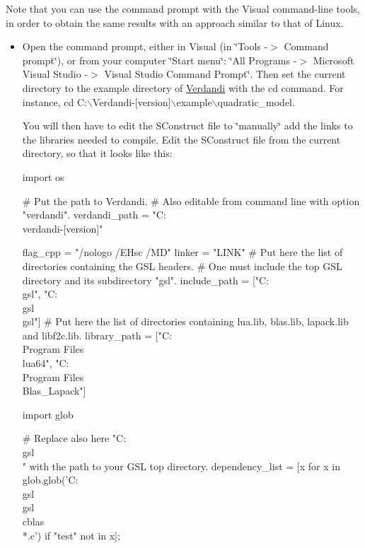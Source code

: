 \documentclass{tufte-book}
\begin{document}
\-Note that you can use the command prompt with the \-Visual command-\/line tools, in order to obtain the same results with an approach similar to that of \-Linux.
\begin{itemize}
\item \-Open the command prompt, either in \-Visual (in \char`\"{}\-Tools -\/$>$ Command prompt\char`\"{}), or from your computer \char`\"{}\-Start menu\char`\"{}\-: \char`\"{}\-All Programs -\/$>$ Microsoft Visual Studio -\/$>$ Visual Studio Command Prompt\char`\"{}. \-Then set the current directory to the example directory of \hyperlink{namespace_verdandi}{\-Verdandi} with the {\ttfamily cd} command. \-For instance, {\ttfamily cd \-C\-:$\backslash$\-Verdandi-\/\mbox{[}version\mbox{]}$\backslash$example$\backslash$quadratic\-\_\-model}.

\-You will then have to edit the {\ttfamily \-S\-Construct} file to \char`\"{}manually\char`\"{} add the links to the libraries needed to compile. \-Edit the {\ttfamily \-S\-Construct} file from the current directory, so that it looks like this\-:

\begin{frame_python}
import os

# Put the path to Verdandi.
# Also editable from command line with option "verdandi".
verdandi_path = "C:\\verdandi-[version]"

flag_cpp = "/nologo /EHsc /MD"
linker = "LINK"
# Put here the list of directories containing the GSL headers.
# One must include the top GSL directory and its subdirectory "gsl".
include_path = ["C:\\gsl", "C:\\gsl\\gsl"]
# Put here the list of directories containing lua.lib, blas.lib, lapack.lib and libf2c.lib.
library_path = ["C:\\Program Files\\lua64", "C:\\Program Files\\Blas_Lapack"]

import glob

# Replace also here "C:\\gsl\\" with the path to your GSL top directory.
dependency_list = [x for x in glob.glob('C:\\gsl\\gsl\\cblas\\*.c') if "test" not in x];


\end{frame_python}
\end{itemize}
\end{document}

